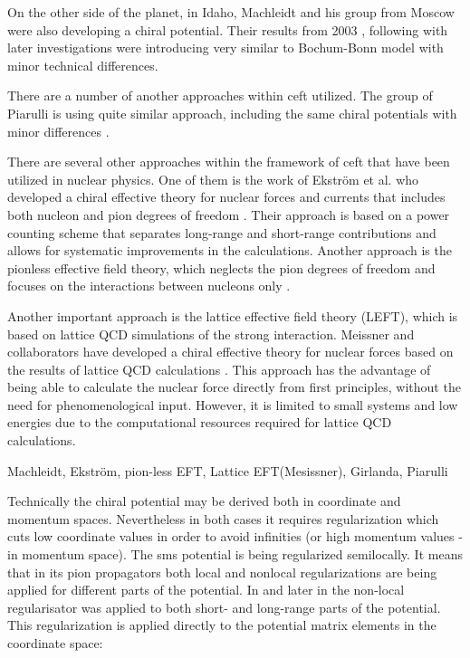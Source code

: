 On the other side of the planet, in Idaho, Machleidt and his group from Moscow were also developing 
a chiral potential. Their results from 2003 \cite{Entem2003}, following with later investigations \cite{Machleidt2005, Machleidt2010, Entem2017} were introducing very similar to Bochum-Bonn
model with minor technical differences.

There are a number of another approaches within \gls{ceft} utilized.
The group of Piarulli is using quite similar approach, including
the same chiral potentials with minor differences \cite{Piarulli2012,Piarulli2015}.

There are several other approaches within the framework of \gls{ceft}
that have been utilized in nuclear physics.
One of them is the work of Ekström et al. who developed a chiral
effective theory for nuclear forces and currents that includes both
nucleon and pion degrees of freedom \cite{?}. Their approach
is based on a power counting scheme that separates long-range and
short-range contributions and allows for systematic improvements in the
calculations. Another approach is the pionless effective field
theory, which neglects the pion degrees of freedom and
focuses on the interactions between nucleons only \cite{?}.

Another important approach is the lattice effective field theory (LEFT), which
is based on lattice QCD simulations of the strong
interaction. Meissner and collaborators have developed a chiral effective
theory for nuclear forces based on the results of lattice QCD
calculations \cite{?}. This approach has the advantage of being able
to calculate the nuclear force directly from first
principles, without the need for phenomenological input. However, it is limited
to small systems and low energies due to the computational
resources required for lattice QCD calculations.


{\color{red} Machleidt, Ekstr\"om, pion-less EFT, Lattice EFT(Mesissner), Girlanda, Piarulli}


Technically the chiral potential may be derived both in coordinate and momentum spaces.
Nevertheless in both cases it requires regularization which cuts 
low coordinate values in order to avoid infinities 
(or high momentum values - in momentum space). 
The \gls{sms} potential is being regularized semilocally. 
It means that  in its pion propagators both local and nonlocal regularizations
are being applied for different parts of the potential.
In \cite{Entem2003, epelbaum2005two} and later in \cite{Entem2017, Epelbaum2014SCS} the non-local regularisator was applied to both short- and long-range parts of the potential. 
This regularization is applied directly to the potential matrix elements 
in the coordinate space:

